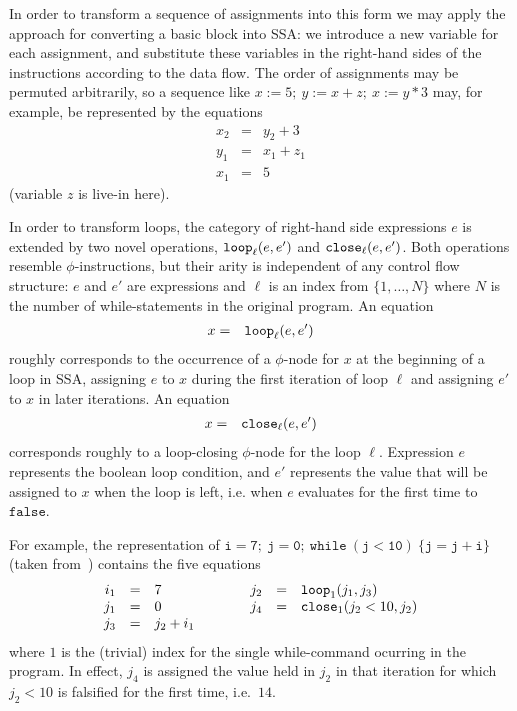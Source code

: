 In order to transform a sequence of assignments into this form we may
apply the approach for converting a basic block into SSA: we introduce
a new variable for each assignment, and substitute these variables in
the right-hand sides of the instructions according to the data
flow. The order of assignments may be permuted arbitrarily, so a
sequence like $x := 5;\ y:=x+z;\ x:=y*3$ may, for example, be
represented by the equations
\begin{eqnarray*}
x_2 & = & y_2 + 3\\
y_1 & = & x_1 + z_1\\
x_1 & = & 5
\end{eqnarray*}
(variable $z$ is live-in here).

In order to transform loops, the category of right-hand side
expressions $e$ is extended by two novel operations, $\mathtt{loop}_{{\ell}}({e},{e'})$ and $\mathtt{close}_{{\ell}}({e},{e'})$.
Both operations resemble $\phi$-instructions, but their arity is
independent of any control flow structure: $e$ and $e'$ are
expressions and $\ell$ is an index from $\{1,\ldots,N\}$ where $N$ is
the number of while-statements in the original program.  An equation
\begin{eqnarray*}
x & = & \mathtt{loop}_{{\ell}}({e},{e'})
\end{eqnarray*}
roughly corresponds to the occurrence of a $\phi$-node for $x$ at the
beginning of a loop in SSA, assigning $e$ to $x$ during the first
iteration of loop $\ell$ and assigning $e'$ to $x$ in later
iterations.
An equation 
\begin{eqnarray*}
x & = & \mathtt{close}_{{\ell}}({e},{e'})
\end{eqnarray*}
corresponds roughly to a loop-closing $\phi$-node for the loop
$\ell$. Expression $e$ represents the boolean loop condition, and $e'$
represents the value that will be assigned to $x$ when the loop is
left, i.e. when $e$ evaluates for the first time to $\mathtt{false}$.

For example, the representation of
$\mathtt{i=7;\ j=0;\ while\ (j<10)\ \{j=j+i\}}$
(taken from~\cite{PopCJS2006}) contains the five equations
$$
\begin{array}{rclcrcl}
i_1 & = & 7 & \qquad & j_2 & = & \mathtt{loop}_{{1}}({j_1},{j_3})\\
j_1 & = & 0 & & j_4 & = & \mathtt{close}_{{1}}({j_2 < 10},{j_2})\\
j_3 & = & j_2 + i_1
\end{array} 
$$ 
where $1$ is the (trivial) index for the single while-command
ocurring in the program.  In effect, $j_4$ is assigned the value held
in $j_2$ in that iteration for which $j_2 < 10$ is falsified for the
first time, i.e.~$14$.

